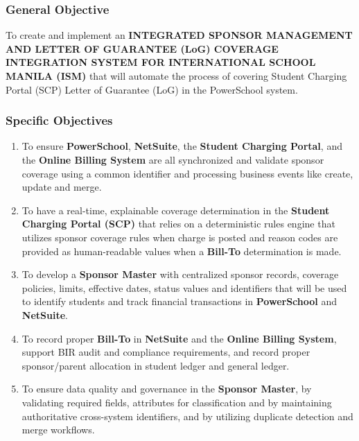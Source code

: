 \subsubsection{General Objective}

    To create and implement an \textbf{INTEGRATED SPONSOR MANAGEMENT AND LETTER OF GUARANTEE (LoG) COVERAGE INTEGRATION SYSTEM FOR INTERNATIONAL SCHOOL MANILA (ISM)} that will automate the process of covering Student Charging Portal (SCP) Letter of Guarantee (LoG) in the PowerSchool system.

\subsubsection{Specific Objectives}

\begin{enumerate}
    \item To ensure \textbf{PowerSchool}, \textbf{NetSuite}, the \textbf{Student Charging Portal}, and the \textbf{Online Billing System} are all synchronized and validate sponsor coverage using a common identifier and processing business events like create, update and merge.

    \item To have a real-time, explainable coverage determination in the \textbf{Student Charging Portal (SCP)} that relies on a deterministic rules engine that utilizes sponsor coverage rules when charge is posted and reason codes are provided as human-readable values when a \textbf{Bill-To} determination is made.

    \item To develop a \textbf{Sponsor Master} with centralized sponsor records, coverage policies, limits, effective dates, status values and identifiers that will be used to identify students and track financial transactions in \textbf{PowerSchool} and \textbf{NetSuite}.

    \item To record proper \textbf{Bill-To} in \textbf{NetSuite} and the \textbf{Online Billing System}, support BIR audit and compliance requirements, and record proper sponsor/parent allocation in student ledger and general ledger.

    \item To ensure data quality and governance in the \textbf{Sponsor Master}, by validating required fields, attributes for classification and by maintaining authoritative cross-system identifiers, and by utilizing duplicate detection and merge workflows.
\end{enumerate}

